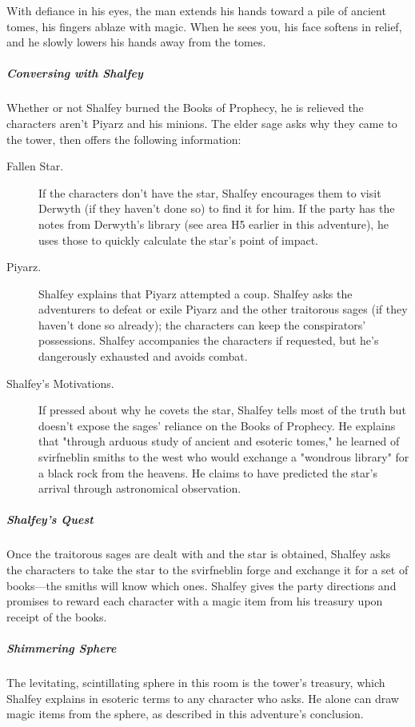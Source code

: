 \documentclass[10pt,a4paper,twoside,bg=print,twocolumn,openany,nodeprecatedcode]{dndbook}
\begin{document}
\begin{DndReadAloud}{}
With defiance in his eyes, the man extends his hands toward a pile of ancient tomes, his fingers ablaze with magic. When he sees you, his face softens in relief, and he slowly lowers his hands away from the tomes.

\end{DndReadAloud}

\subparagraph{Conversing with Shalfey}
Whether or not Shalfey burned the Books of Prophecy, he is relieved the characters aren't Piyarz and his minions. The elder sage asks why they came to the tower, then offers the following information:


\begin{description}
\item[Fallen Star.]
If the characters don't have the star, Shalfey encourages them to visit Derwyth (if they haven't done so) to find it for him. If the party has the notes from Derwyth's library (see area H5 earlier in this adventure), he uses those to quickly calculate the star's point of impact.
\item[Piyarz.]
Shalfey explains that Piyarz attempted a coup. Shalfey asks the adventurers to defeat or exile Piyarz and the other traitorous sages (if they haven't done so already); the characters can keep the conspirators' possessions. Shalfey accompanies the characters if requested, but he's dangerously exhausted and avoids combat.
\item[Shalfey's Motivations.]
If pressed about why he covets the star, Shalfey tells most of the truth but doesn't expose the sages' reliance on the Books of Prophecy. He explains that "through arduous study of ancient and esoteric tomes," he learned of svirfneblin smiths to the west who would exchange a "wondrous library" for a black rock from the heavens. He claims to have predicted the star's arrival through astronomical observation.
\end{description}

\subparagraph{Shalfey's Quest}
Once the traitorous sages are dealt with and the star is obtained, Shalfey asks the characters to take the star to the svirfneblin forge and exchange it for a set of books—the smiths will know which ones. Shalfey gives the party directions and promises to reward each character with a magic item from his treasury upon receipt of the books.

\subparagraph{Shimmering Sphere}
The levitating, scintillating sphere in this room is the tower's treasury, which Shalfey explains in esoteric terms to any character who asks. He alone can draw magic items from the sphere, as described in this adventure's conclusion.
\end{document}
